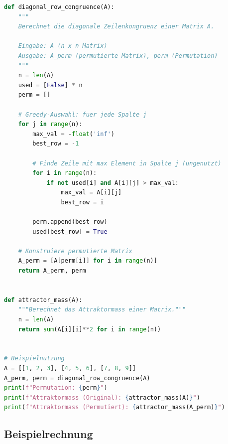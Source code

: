 \documentclass[a4paper,12pt]{article}
\theoremstyle{definition}
\begin{document}
\begin{lstlisting}[language=Python, caption=Diagonale Zeilenkongruenz]
def diagonal_row_congruence(A):
    """
    Berechnet die diagonale Zeilenkongruenz einer Matrix A.
    
    Eingabe: A (n x n Matrix)
    Ausgabe: A_perm (permutierte Matrix), perm (Permutation)
    """
    n = len(A)
    used = [False] * n
    perm = []
    
    # Greedy-Auswahl: fuer jede Spalte j
    for j in range(n):
        max_val = -float('inf')
        best_row = -1
        
        # Finde Zeile mit max Element in Spalte j (ungenutzt)
        for i in range(n):
            if not used[i] and A[i][j] > max_val:
                max_val = A[i][j]
                best_row = i
        
        perm.append(best_row)
        used[best_row] = True
    
    # Konstruiere permutierte Matrix
    A_perm = [A[perm[i]] for i in range(n)]
    return A_perm, perm


def attractor_mass(A):
    """Berechnet das Attraktormass einer Matrix."""
    n = len(A)
    return sum(A[i][i]**2 for i in range(n))


# Beispielnutzung
A = [[1, 2, 3], [4, 5, 6], [7, 8, 9]]
A_perm, perm = diagonal_row_congruence(A)
print(f"Permutation: {perm}")
print(f"Attraktormass (Original): {attractor_mass(A)}")
print(f"Attraktormass (Permutiert): {attractor_mass(A_perm)}")
\end{lstlisting}

\subsection{Beispielrechnung}
\end{document}
